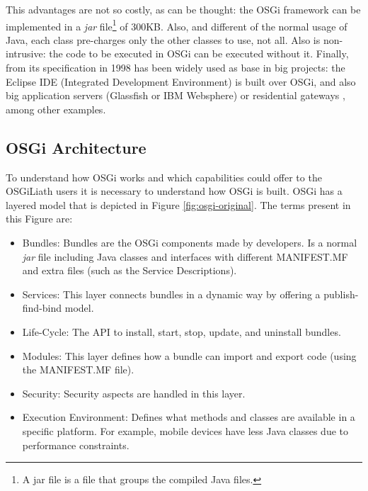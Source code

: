 \documentclass{sig-alternate}
\begin{document}
This advantages are not so
                               costly, as can be thought: the OSGi
                                framework can be implemented in a
                                {\em jar} file\footnote{A jar file is
                                a file that groups the compiled Java
                                files.} of 300KB. Also, and different
                                of the normal usage of Java, each
                                class pre-charges only the other
                                classes to use, not all. Also is
                                non-intrusive: the code to be
                                executed in OSGi can be executed
                                without it. Finally, from its
                                specification in 1998 has been widely
                                used as base in big projects: the
                                Eclipse IDE (Integrated Development
                                Environment) is built over OSGi, and
                                also big application servers
                               (Glassfish or IBM Websphere) or
                               residential gateways
                               \cite{GATEWAY}, among other
                               examples. 

\subsection{OSGi Architecture}
To understand how OSGi \cite{OSGI} works and which capabilities could offer to the OSGiLiath users it is necessary to understand how OSGi is built. OSGi has a layered model that is depicted in Figure \ref{fig:osgi-original}. The terms present in this Figure are:

\begin{itemize}
\item Bundles: Bundles are the OSGi components made by developers. Is a normal {\em jar} file including Java classes and interfaces with different MANIFEST.MF and extra files (such as the Service Descriptions).
\item Services: This layer connects bundles in a dynamic way by offering a publish-find-bind model.
\item Life-Cycle: The API to install, start, stop, update, and uninstall bundles.
\item Modules: This layer defines how a bundle can import and export code (using the MANIFEST.MF file).
\item Security: Security aspects are handled in this layer.
\item Execution Environment: Defines what methods and classes are available in a specific platform. For example, mobile devices have less Java classes due to performance constraints.
\end{itemize}
\end{document}
